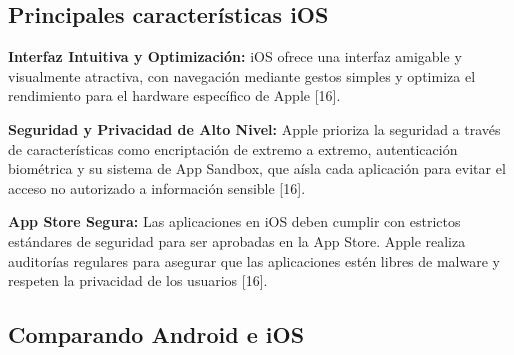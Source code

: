 \subsection{Principales características iOS}


    \begin{list}{}%
        {\setlength{\leftmargin}{1cm}%
         \setlength{\rightmargin}{1cm}%
         \setlength{\itemsep}{0.5\baselineskip}%
         \setlength{\parsep}{0pt}}
         
        \item\relax
        \small
        \textbf{Interfaz Intuitiva y Optimización:} iOS ofrece una interfaz amigable y visualmente atractiva, con navegación mediante gestos simples y optimiza el rendimiento para el hardware específico de Apple [16].
 
        
        \item\relax
        \small
        \textbf{Seguridad y Privacidad de Alto Nivel:} Apple prioriza la seguridad a través de características como encriptación de extremo a extremo, autenticación biométrica y su sistema de App Sandbox, que aísla cada aplicación para evitar el acceso no autorizado a información sensible [16].

        
        \item\relax
        \small
        \textbf{App Store Segura:} Las aplicaciones en iOS deben cumplir con estrictos estándares de seguridad para ser aprobadas en la App Store. Apple realiza auditorías regulares para asegurar que las aplicaciones estén libres de malware y respeten la privacidad de los usuarios [16].
        
        \end{list}

\subsection{Comparando Android e iOS}

